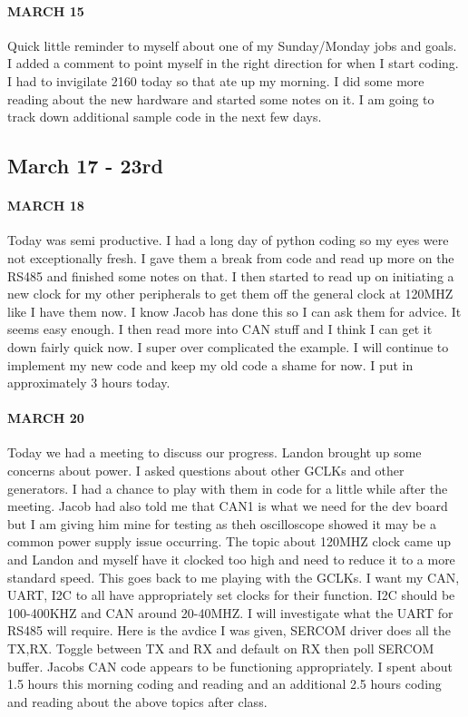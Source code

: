 \documentclass{article}
\begin{document}
\paragraph{MARCH 15} Quick little reminder to myself about one of my Sunday/Monday jobs and goals. I added a comment to point myself in the right direction for when I start coding. I had to invigilate 2160 today so that ate up my morning. I did some more reading about the new hardware and started some notes on it. I am going to track down additional sample code in the next few days.
\subsection{March 17 - 23rd}
\paragraph{MARCH 18} Today was semi productive. I had a long day of python coding so my eyes were not exceptionally fresh. I gave them a break from code and read up more on the RS485 and finished some notes on that. I then started to read up on initiating a new clock for my other peripherals to get them off the general clock at 120MHZ like I have them now. I know Jacob has done this so I can ask them for advice. It seems easy enough. I then read more into CAN stuff and I think I can get it down fairly quick now. I super over complicated the example. I will continue to implement my new code and keep my old code a shame for now. I put in approximately 3 hours today. 
\paragraph{MARCH 20} Today we had a meeting to discuss our progress. Landon brought up some concerns about power. I asked questions about other GCLKs and other generators. I had a chance to play with them in code for a little while after the meeting. Jacob had also told me that CAN1 is what we need for the dev board but I am giving him mine for testing as theh oscilloscope showed it may be a common power supply issue occurring. The topic about 120MHZ clock came up and Landon and myself have it clocked too high and need to reduce it to a more standard speed. This goes back to me playing with the GCLKs. I want my CAN, UART, I2C to all have appropriately set clocks for their function. I2C should be 100-400KHZ and CAN around 20-40MHZ. I will investigate what the UART for RS485 will require. Here is the avdice I was given, SERCOM driver does all the TX,RX. Toggle between TX and RX and default on RX then poll SERCOM buffer. Jacobs CAN code appears to be functioning appropriately. I spent about 1.5 hours this morning coding and reading and an additional 2.5 hours coding and reading about the above topics after class. 
\end{document}
